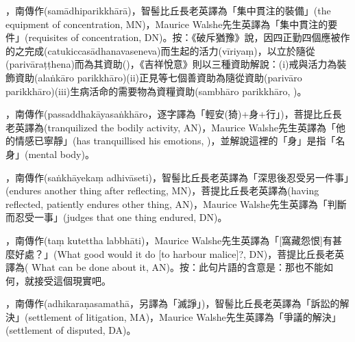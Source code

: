 \startitemgroup[noteitems]
\item{}，南傳作(samādhiparikkhārā)，智髻比丘長老英譯為「集中貫注的裝備」(the equipment of concentration, MN)，Maurice Walshe先生英譯為「集中貫注的要件」(requisites of concentration, DN)。按：《破斥猶豫》說，因四正勤四個應被作的之完成(catukiccasādhanavaseneva)而生起的活力(vīriyaṃ)，以立於隨從(parivāraṭṭhena)而為其資助()，《吉祥悅意》則以三種資助解說：(i)戒與活力為裝飾資助(alaṅkāro parikkhāro)(ii)正見等七個善資助為隨從資助(parivāro parikkhāro)(iii)生病活命的需要物為資糧資助(sambhāro parikkhāro, )。
\stopitemgroup

\startitemgroup[noteitems]
\item{}，南傳作(passaddhakāyasaṅkhāro，逐字譯為「輕安(猗)+身+行」)，菩提比丘長老英譯為(tranquilized the bodily activity, AN)，Maurice Walshe先生英譯為「他的情感已寧靜」(has tranquillised his emotions, )，並解說這裡的「身」是指「名身」(mental body)。
\stopitemgroup

\startitemgroup[noteitems]
\item{}，南傳作(saṅkhāyekaṃ adhivāseti)，智髻比丘長老英譯為「深思後忍受另一件事」(endures another thing after reflecting, MN)，菩提比丘長老英譯為(having reflected, patiently endures other thing, AN)，Maurice Walshe先生英譯為「判斷而忍受一事」(judges that one thing endured, DN)。
\stopitemgroup

\startitemgroup[noteitems]
\item{}，南傳作(taṃ kutettha labbhāti)，Maurice Walshe先生英譯為「[窩藏怨恨]有甚麼好處？」(What good would it do [to harbour malice]?, DN)，菩提比丘長老英譯為( What can be done about it, AN)。按：此句片語的含意是：那也不能如何，就接受這個現實吧。
\stopitemgroup

\startitemgroup[noteitems]
\item{}，南傳作(adhikaraṇasamathā，另譯為「滅諍」)，智髻比丘長老英譯為「訴訟的解決」(settlement of litigation, MA)，Maurice Walshe先生英譯為「爭議的解決」(settlement of disputed, DA)。
\stopitemgroup

